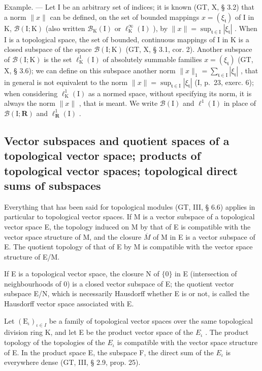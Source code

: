 Example. --- Let I be an arbitrary set of indices; it is known (GT, X, § 3.2) that a norm \(\|x\|\) can be defined, on the set of bounded mappings \(x = (\xi_{\mathfrak{t}})\) of I in K, \(\mathcal{B}(\mathrm{I};\mathrm{K})\) (also written \(\mathcal{B}_{\mathrm{K}}(\mathrm{I})\) or \(\ell_{\mathrm{K}}^{\infty}(\mathrm{I})\) ), by \(\|x\| = \sup_{\mathfrak{t}\in \mathrm{I}}|\xi_{\mathfrak{t}}|\) . When I is a topological space, the set of bounded, continuous mappings of I in K is a closed subspace of the space \(\mathcal{B}(\mathrm{I};\mathrm{K})\) (GT, X, § 3.1, cor. 2). Another subspace of \(\mathcal{B}(\mathrm{I};\mathrm{K})\) is the set \(\ell_{\mathrm{K}}^{1}(\mathrm{I})\) of absolutely summable families \(x = (\xi_{\mathfrak{t}})\) (GT, X, § 3.6); we can define on this subspace another norm \(\|x\|_1 = \sum_{\mathfrak{t}\in \mathrm{I}}|\xi_{\mathfrak{t}}|\) , that in general is not equivalent to the norm \(\|x\| = \sup_{\mathfrak{t}\in \mathrm{I}}|\xi_{\mathfrak{t}}|\) (I, p.~23, exerc. 6); when considering \(\ell_{\mathrm{K}}^{1}(\mathrm{I})\) as a normed space, without specifying its norm, it is always the norm \(\|x\|\) , that is meant. We write \(\mathcal{B}(\mathrm{I})\) and \(\ell^1 (\mathrm{I})\) in place of \(\mathcal{B}(\mathrm{I};\mathbf{R})\) and \(\ell_{\mathbf{R}}^{1}(\mathrm{I})\) .

\subsection{Vector subspaces and quotient spaces of a topological vector space; products of topological vector spaces; topological direct sums of subspaces}

Everything that has been said for topological modules (GT, III, § 6.6) applies in particular to topological vector spaces. If M is a vector subspace of a topological vector space E, the topology induced on M by that of E is compatible with the vector space structure of M, and the closure \(\overline{M}\) of M in E is a vector subspace of E. The quotient topology of that of E by M is compatible with the vector space structure of E/M.

If E is a topological vector space, the closure N of \(\{0\}\) in E (intersection of neighbourhoods of 0) is a closed vector subspace of E; the quotient vector subspace E/N, which is necessarily Hausdorff whether E is or not, is called the Hausdorff vector space associated with E.

Let \((\mathrm{E}_{\iota})_{\iota \in I}\) be a family of topological vector spaces over the same topological division ring K, and let E be the product vector space of the \(E_{\iota}\) . The product topology of the topologies of the \(E_{\iota}\) is compatible with the vector space structure of E. In the product space E, the subspace F, the direct sum of the \(E_{\iota}\) is everywhere dense (GT, III, § 2.9, prop. 25).

